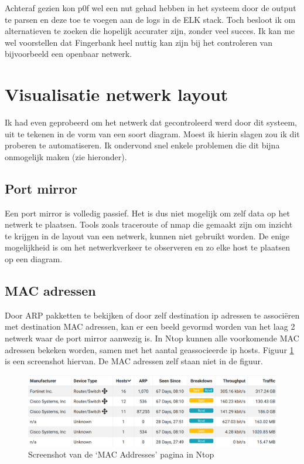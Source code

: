 \documentclass[a4paper,12pt]{report}
\begin{document}
Achteraf gezien kon p0f wel een nut gehad hebben in het systeem door de output te parsen en deze toe te voegen aan de logs in de ELK stack.
Toch besloot ik om alternatieven te zoeken die hopelijk accurater zijn, zonder veel succes.
Ik kan me wel voorstellen dat Fingerbank heel nuttig kan zijn bij het controleren van bijvoorbeeld een openbaar netwerk.

\section{Visualisatie netwerk layout}
Ik had even geprobeerd om het netwerk dat gecontroleerd werd door dit systeem, uit te tekenen in de vorm van een soort diagram.
Moest ik hierin slagen zou ik dit proberen te automatiseren.
Ik ondervond snel enkele problemen die dit bijna onmogelijk maken (zie hieronder).

\subsection{Port mirror}
Een port mirror is volledig passief.
Het is dus niet mogelijk om zelf data op het netwerk te plaatsen.
Tools zoals traceroute of nmap die gemaakt zijn om inzicht te krijgen in de layout van een netwerk, kunnen niet gebruikt worden.
De enige mogelijkheid is om het netwerkverkeer te observeren en zo elke host te plaatsen op een diagram.

\subsection{MAC adressen}
Door ARP pakketten te bekijken of door zelf destination ip adressen te associëren met destination MAC adressen, kan er een beeld gevormd worden van het laag 2 netwerk waar de port mirror aanwezig is.
In Ntop kunnen alle voorkomende MAC adressen bekeken worden, samen met het aantal geassocieerde ip hosts.
Figuur \ref{fig:visualisatie-netwerk-layout-ntop-mac} is een screenshot hiervan.
De MAC adressen zelf staan niet in de figuur.

\begin{figure}[H]
  \centering
  \includegraphics[width=\textwidth]{visualisatie-netwerk-layout-ntop-mac}
  \caption{Screenshot van de `MAC Addresses' pagina in Ntop}
  \label{fig:visualisatie-netwerk-layout-ntop-mac}
\end{figure}
\end{document}
